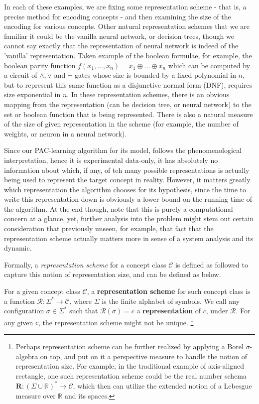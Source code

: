 In each of these examples, we are fixing some representation scheme - that is, a precise method for encoding concepts - and then examining the size of the encoding for various concepts. Other natural representation schemes that we are familiar it could be the vanilla neural network, or decision trees, though we cannot say exactly that the representation of neural network is indeed of the 'vanilla' representation. Taken example of the boolean formulae, for example, the boolean parity function $f(x_1,\dots,x_n)=x_1\oplus \dots\oplus x_n$ which can be computed by a circuit of $\land,\lor$ and $\lnot$ gates whose size is bounded by a fixed polynomial in $n$, but to represent this same function as a disjunctive normal form (DNF), requires size exponential in $n$. In these representation schemes, there is an obvious mapping from the representation (can be decision tree, or neural network) to the set or boolean function that is being represented. There is also a natural measure of the size of given representation in the scheme (for example, the number of weights, or neuron in a neural network). 

Since our PAC-learning algorithm for its model, follows the phenomenological interpretation, hence it is experimental data-only, it has absolutely no information about which, if any, of teh many possible representations is actually being used to represent the target concept in reality. However, it matters greatly which representation the algorithm chooses for its hypothesis, since the time to write this representation down is obviously a lower bound on the running time of the algorithm. At the end though, note that this is purely a computational concern at a glance, yet, further analysis into the problem might stem out certain consideration that previously unseen, for example, that fact that the representation scheme actually matters more in sense of a system analysis and its dynamic. 

Formally, a \textit{representation scheme} for a concept class $\mathcal{C}$ is defined as followed to capture this notion of representation size, and can be defined as below. 

\begin{definition}
    For a given concept class $\mathcal{C}$, a \textbf{representation scheme} for such concept class is a function $\bm{\mathcal{R}}: \Sigma^{*}\to \mathcal{C}$, where $\Sigma$ is the finite alphabet of symbols. We call any configuration $\sigma \in \Sigma^{*}$ such that $\bm{\mathcal{R}}(\sigma)=c$ a \textbf{representation} of $c$, under $\bm{\mathcal{R}}$. For any given $c$, the representation scheme might not be unique. \footnote{Perhaps representation scheme can be further realized by applying a Borel $\sigma$-algebra on top, and put on it a perspective measure to handle the notion of representation size. For example, in the traditional example of axis-aligned rectangle, one such representation scheme could be the real number schema $\bm{R}:(\Sigma \cup \mathbb{R})^{*}\to \mathcal{C}$, which then can utilize the extended notion of a Lebesgue measure over $\mathbb{R}$ and its spaces.}
\end{definition} 

